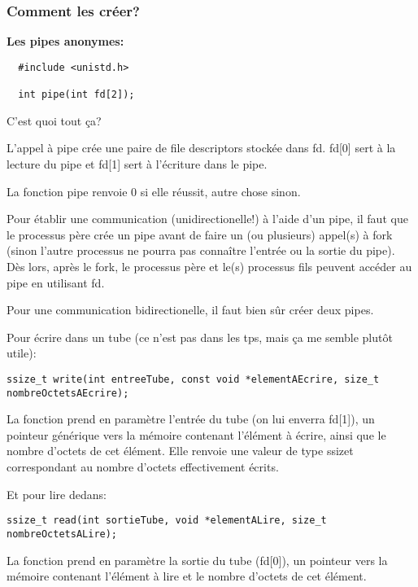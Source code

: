\documentclass[a4paper]{article}
\begin{document}
\subsubsection{Comment les créer?}
\textbf{Les pipes anonymes:}
\begin{lstlisting}
  #include <unistd.h>

  int pipe(int fd[2]);
\end{lstlisting}
C'est quoi tout ça?\newline
\begin{description}
  \item L'appel à pipe crée une paire de \guillemotleft{}file descriptors\guillemotright{} stockée dans fd.\newline
           fd[0] sert à la lecture du pipe et fd[1] sert à l'écriture dans le pipe.
  \item La fonction pipe renvoie 0 si elle réussit, autre chose sinon.
  \item Pour établir une communication (unidirectionelle!) à l'aide d'un pipe, il faut que le processus père crée un pipe avant de faire un (ou plusieurs) appel(s) à fork (sinon l'autre processus ne pourra pas connaître l'entrée ou la sortie du pipe). Dès lors, après le fork, le processus père et le(s) processus fils peuvent accéder au pipe en utilisant fd.
  \item Pour une communication bidirectionelle, il faut bien sûr créer deux pipes.
\end{description}
Pour écrire dans un tube (ce n'est pas dans les tps, mais ça me semble plutôt utile):
\begin{lstlisting}
ssize_t write(int entreeTube, const void *elementAEcrire, size_t nombreOctetsAEcrire);
\end{lstlisting}
La fonction prend en paramètre l'entrée du tube (on lui enverra fd[1]), un pointeur générique vers la mémoire contenant l'élément à écrire, ainsi que le nombre d'octets de cet élément.\newline
Elle renvoie une valeur de type ssize\textunderscore{}t correspondant au nombre d'octets effectivement écrits.\par
Et pour lire dedans:
\begin{lstlisting}
ssize_t read(int sortieTube, void *elementALire, size_t nombreOctetsALire);
\end{lstlisting}
La fonction prend en paramètre la sortie du tube (fd[0]), un pointeur vers la mémoire contenant l'élément à lire et le nombre d'octets de cet élément.\newline
\end{document}
